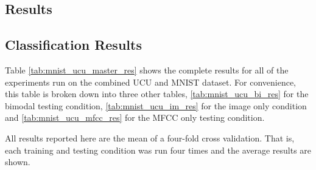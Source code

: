 \begin{table}
	\end{table}




\subsection{Results}

\subsection{Classification Results}
Table \ref{tab:mnist_ucu_master_res} shows the complete results for all of the experiments run on the combined UCU and MNIST dataset. For convenience, this table is broken down into three other tables, \ref{tab:mnist_ucu_bi_res} for the bimodal testing condition, \ref{tab:mnist_ucu_im_res} for the image only condition and \ref{tab:mnist_ucu_mfcc_res} for the MFCC only testing condition. 

All results reported here are the mean of a four-fold cross validation. That is, each training and testing condition was run four times and the average results are shown.

